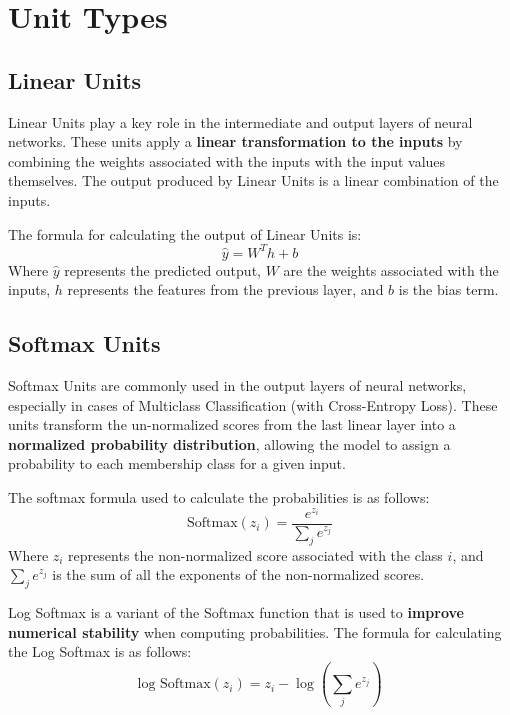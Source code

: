 \section{Unit Types}

\subsection{Linear Units}

Linear Units play a key role in the intermediate and output layers of neural networks. These units apply a \textbf{linear transformation to the inputs} by combining the weights associated with the inputs with the input values themselves. The output produced by Linear Units is a linear combination of the inputs. 

The formula for calculating the output of Linear Units is:
$$
\hat{y} = W^T h + b
$$
Where \( \hat{y} \) represents the predicted output, \( W \) are the weights associated with the inputs, \( h \) represents the features from the previous layer, and \( b \) is the bias term.

\subsection{Softmax Units}

Softmax Units are commonly used in the output layers of neural networks, especially in cases of Multiclass Classification (with Cross-Entropy Loss). These units transform the un-normalized scores from the last linear layer into a \textbf{normalized probability distribution}, allowing the model to assign a probability to each membership class for a given input.

The softmax formula used to calculate the probabilities is as follows:
$$
\text{Softmax}(z_i) = \frac{e^{z_i}}{\sum_{j} e^{z_j}}
$$
Where \( z_i \) represents the non-normalized score associated with the class \( i \), and \( \sum_{j} e^{z_j} \) is the sum of all the exponents of the non-normalized scores.

Log Softmax is a variant of the Softmax function that is used to \textbf{improve numerical stability} when computing probabilities. The formula for calculating the Log Softmax is as follows:
$$
\text{log Softmax}(z_i) = z_i - \log\left(\sum_{j} e^{z_j}\right)
$$

